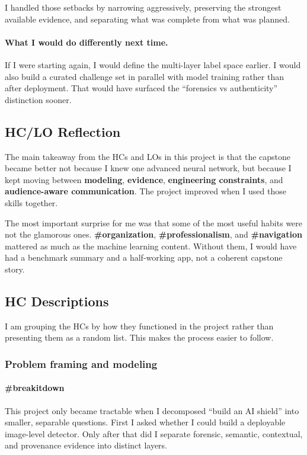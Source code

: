 \documentclass[11pt]{article}
\begin{document}
I handled those setbacks by narrowing aggressively, preserving the strongest available evidence, and separating what was complete from what was planned.

\paragraph{What I would do differently next time.}
If I were starting again, I would define the multi-layer label space earlier. I would also build a curated challenge set in parallel with model training rather than after deployment. That would have surfaced the ``forensics vs authenticity'' distinction sooner.

\subsection{HC/LO Reflection}
The main takeaway from the HCs and LOs in this project is that the capstone became better not because I knew one advanced neural network, but because I kept moving between \textbf{modeling}, \textbf{evidence}, \textbf{engineering constraints}, and \textbf{audience-aware communication}. The project improved when I used those skills together.

The most important surprise for me was that some of the most useful habits were not the glamorous ones. \textbf{\#organization}, \textbf{\#professionalism}, and \textbf{\#navigation} mattered as much as the machine learning content. Without them, I would have had a benchmark summary and a half-working app, not a coherent capstone story.

\subsection{HC Descriptions}
I am grouping the HCs by how they functioned in the project rather than presenting them as a random list. This makes the process easier to follow.

\subsubsection*{Problem framing and modeling}
\paragraph{\#breakitdown}
This project only became tractable when I decomposed ``build an AI shield'' into smaller, separable questions. First I asked whether I could build a deployable image-level detector. Only after that did I separate forensic, semantic, contextual, and provenance evidence into distinct layers.
\end{document}
